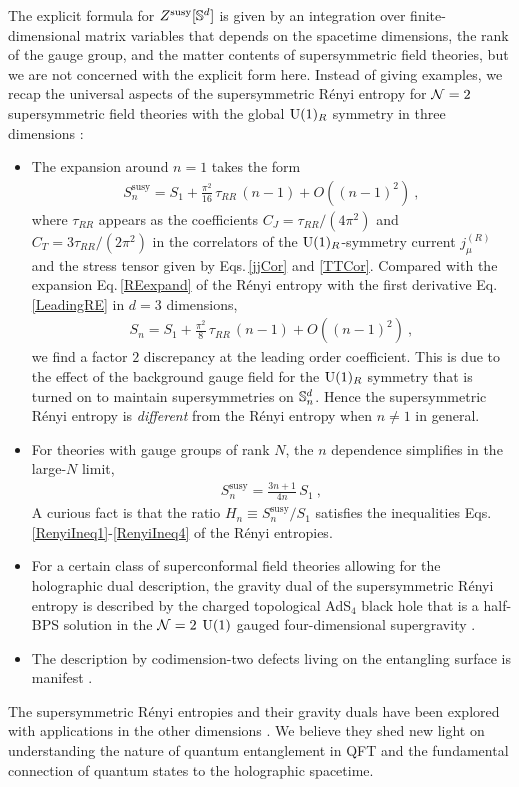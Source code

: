 The explicit formula for $Z^\text{susy}[\mathbb{S}^d]$ is given by an integration over finite-dimensional matrix variables that depends on the spacetime dimensions, the rank of the gauge group, and the matter contents of supersymmetric field theories, but we are not concerned with the explicit form here.
Instead of giving examples, we recap the universal aspects of the supersymmetric R{\'e}nyi entropy for ${\cal N}= 2$ supersymmetric field theories with the global $\mathrm{U}(1)_R$ symmetry in three dimensions \cite{Nishioka:2013haa}:
\begin{itemize}
\item The expansion around $n=1$ takes the form
\begin{align}
	S_n^\text{susy} = S_1 + \frac{\pi^2}{16}\,\tau_{RR}\,(n-1) + O\left((n-1)^2 \right) \ ,
\end{align}
where $\tau_{RR}$ appears as the coefficients $C_J = \tau_{RR}/(4\pi^2)$ and $C_T = 3 \tau_{RR}/(2\pi^2)$ in the correlators of the $\mathrm{U}(1)_R$-symmetry current $j_\mu^{(R)}$ and the stress tensor given by Eqs.\,\eqref{jjCor} and \eqref{TTCor}.
Compared with the expansion Eq.\,\eqref{REexpand} of the R{\'e}nyi entropy with the first derivative Eq.\,\eqref{LeadingRE} in $d=3$ dimensions,  
\begin{align}
	S_n = S_1 + \frac{\pi^2}{8}\, \tau_{RR}\,(n-1) + O\left((n-1)^2 \right) \ ,
\end{align}
we find a factor $2$ discrepancy at the leading order coefficient.
This is due to the effect of the background gauge field for the $\mathrm{U}(1)_R$ symmetry that is turned on to maintain supersymmetries on $\mathbb{S}^d_n$. 
Hence the supersymmetric R{\'e}nyi entropy is \emph{different} from the R{\'e}nyi entropy when $n\neq 1$ in general.
\item For theories with gauge groups of rank $N$, the $n$ dependence simplifies in the large-$N$ limit,
\begin{align} 
	S_n^\text{susy} = \frac{3n+1}{4n}\, S_1 \ ,
\end{align}
A curious fact is that the ratio $H_n\equiv S_n^\text{susy}/S_1$ satisfies the inequalities Eqs.\,\eqref{RenyiIneq1}-\eqref{RenyiIneq4} of the R{\'e}nyi entropies.
\item For a certain class of superconformal field theories allowing for the holographic dual description, the gravity dual of the supersymmetric R{\'e}nyi entropy is described by the charged topological AdS$_4$ black hole that is a half-BPS solution in the ${\cal N}= 2$ $\mathrm{U}(1)$ gauged four-dimensional supergravity \cite{Nishioka:2014mwa,Huang:2014gca}.
\item The description by codimension-two defects living on the entangling surface is manifest \cite{Nishioka:2016guu}.
\end{itemize}


The supersymmetric R{\'e}nyi entropies and their gravity duals have been explored with applications in the other dimensions \cite{Mori:2015bro,Giveon:2015cgs,Huang:2014pda,Zhou:2015cpa,Hama:2014iea,Alday:2014fsa,Nian:2015xky,Zhou:2015kaj,Yankielowicz:2017xkf}.
We believe they shed new light on understanding the nature of quantum entanglement in QFT and the fundamental connection of quantum states to the holographic spacetime.


\endinput